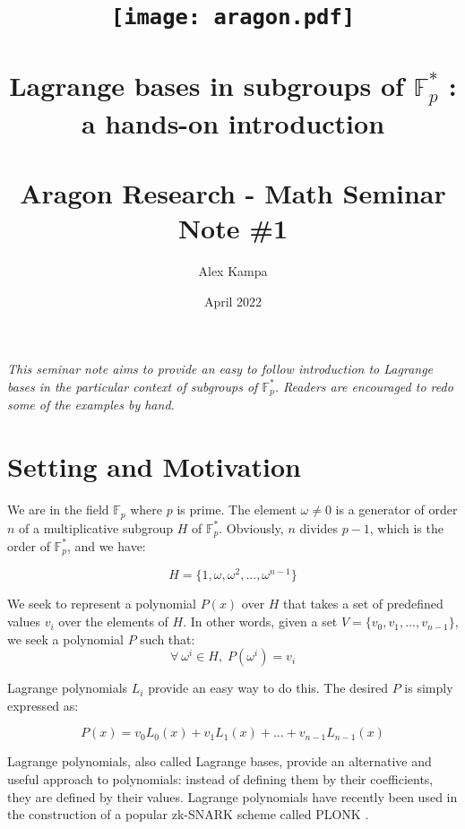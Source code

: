\documentclass[a4paper]{article}
\title{\texttt{[image: aragon.pdf]}\\
  \; \\
  Lagrange bases in subgroups of $\mathbb{F}_p^{*}$ :\\
  a hands-on introduction \\
  \small \; \\
  \small Aragon Research - Math Seminar Note \#1}
\author{Alex Kampa}
\date{April 2022}
\begin{document}
\maketitle

\textit{This seminar note aims to provide an easy to follow introduction to Lagrange
bases in the particular context of subgroups of $\mathbb{F}_p^{*}$. Readers are encouraged to redo some of the examples by hand.}



\section{Setting and Motivation}

We are in the field $\mathbb{F}_p$ where $p$ is prime. The element $\omega \neq 0$ is a generator of order $n$ of a multiplicative subgroup $H$ of $\mathbb{F}_p^{*}$. Obviously, $n$ divides $p-1$, which is the order of $\mathbb{F}_p^{*}$, and we have:

\begin{equation}
    H = \{ 1, \omega, \omega^2, ..., \omega^{n-1} \}
\end{equation}

We seek to represent a polynomial $P(x)$ over $H$ that takes a set of predefined values $v_i$ over the elements of $H$. In other words, given a set $V = \{v_0, v_1, ..., v_{n-1}\}$, we seek a polynomial $P$ such that:
\begin{equation}
    \forall \: \omega^i \in H, \; P(\omega^i) = v_i
\end{equation}

Lagrange polynomials $L_i$ provide an easy way to do this. The desired $P$ is simply expressed as:

\begin{equation}
    P(x) = v_0 L_0(x) + v_1 L_1(x) + ... + v_{n-1} L_{n-1}(x)
\end{equation}

Lagrange polynomials, also called Lagrange bases, provide an alternative and useful approach to polynomials: instead of defining them by their coefficients, they are defined by their values. Lagrange polynomials have recently been used in the construction of a popular zk-SNARK scheme called PLONK \cite{DBLP:journals/iacr/GabizonWC19}.


\end{document}
